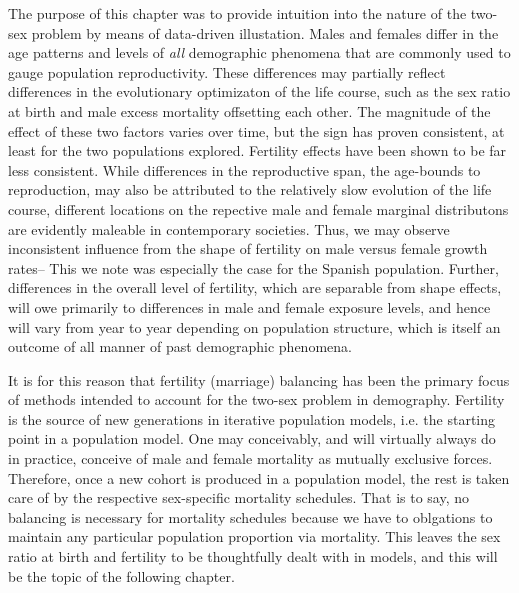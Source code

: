 \FloatBarrier

The purpose of this chapter was to provide intuition into the nature of the
two-sex problem by means of data-driven illustation. Males and females differ in
the age patterns and levels of \textit{all} demographic phenomena that are
commonly used to gauge population reproductivity. These differences may partially reflect
differences in the evolutionary optimizaton of the life course, such as the sex 
ratio at birth and male excess mortality offsetting each
other. The magnitude of the effect of these two factors varies over time, but
the sign has proven consistent, at least for the two populations explored.
Fertility effects have been shown to be far less consistent. While differences
in the reproductive span, the age-bounds to reproduction, may also be attributed
to the relatively slow evolution of the life course, different locations on the
repective male and female marginal distributons are evidently maleable in
contemporary societies. Thus, we may observe inconsistent influence from the shape of
fertility on male versus female growth rates-- This we note was especially the 
case for the Spanish population. Further, differences in the
overall level of fertility, which are separable from shape effects, will 
owe primarily to differences in male and female exposure levels, and hence will vary
from year to year depending on population structure, which is itself an outcome
of all manner of past demographic phenomena.

It is for this reason that fertility (marriage) balancing has been the primary
focus of methods intended to account for the two-sex problem in demography.
Fertility is the source of new generations in iterative population models, i.e.
the starting point in a population model. One may conceivably, and will virtually
always do in practice, conceive of male and female mortality as mutually
exclusive forces. Therefore, once a new cohort is produced in a population
model, the rest is taken care of by the respective sex-specific mortality
schedules. That is to say, no balancing is necessary for mortality schedules
because we have to oblgations to maintain any particular population
proportion via mortality. This leaves the sex ratio at birth and fertility to
be thoughtfully dealt with in models, and this will be the topic of the following chapter.

